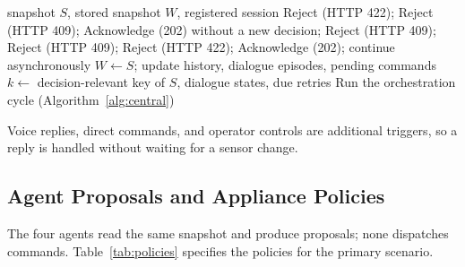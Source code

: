 \documentclass[conference]{IEEEtran}
\begin{document}
\begin{algorithm}[!tbp]
\caption{Snapshot acceptance and trigger evaluation}
\label{alg:ingest}
\footnotesize
\begin{algorithmic}[1]
\Require snapshot $S$, stored snapshot $W$, registered session
  \State Reject (HTTP 422); \Return
\EndIf
{}
  \State Reject (HTTP 409); \Return
\EndIf
{}
    \State Acknowledge (202) without a new decision; \Return
  \Else
    \State Reject (HTTP 409); \Return
  \EndIf
\EndIf
{}
  \State Reject (HTTP 409); \Return
\EndIf
{}
  \State Reject (HTTP 422); \Return
\EndIf
\State Acknowledge (202); continue asynchronously
\State $W \gets S$; update history, dialogue episodes, pending commands
\State $k \gets$ decision-relevant key of $S$, dialogue states, due retries
  \State Run the orchestration cycle (Algorithm~\ref{alg:central})
\EndIf
\end{algorithmic}
\end{algorithm}

Voice replies, direct commands, and operator controls are additional
triggers, so a reply is handled without waiting for a sensor change.

\subsection{Agent Proposals and Appliance Policies}
\label{sec:agents}

The four agents read the same snapshot and produce proposals;
none dispatches commands. Table~\ref{tab:policies} specifies the
policies for the primary scenario.
\end{document}
